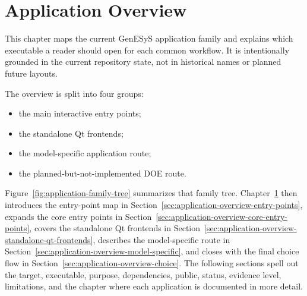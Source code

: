 \chapter{Application Overview}
\label{chap:application-overview}

This chapter maps the current GenESyS application family and explains which
executable a reader should open for each common workflow. It is intentionally
grounded in the current repository state, not in historical names or planned
future layouts.

The overview is split into four groups:
\begin{itemize}
\item the main interactive entry points;
\item the standalone Qt frontends;
\item the model-specific application route;
\item the planned-but-not-implemented DOE route.
\end{itemize}

Figure~\ref{fig:application-family-tree} summarizes that family tree. Chapter~\ref{chap:application-overview} then introduces the entry-point map in
Section~\ref{sec:application-overview-entry-points}, expands the core entry
points in Section~\ref{sec:application-overview-core-entry-points}, covers the
standalone Qt frontends in Section~\ref{sec:application-overview-standalone-qt-frontends},
describes the model-specific route in Section~\ref{sec:application-overview-model-specific},
and closes with the final choice flow in Section~\ref{sec:application-overview-choice}.
The following sections spell out the target, executable, purpose,
dependencies, public, status, evidence level, limitations, and the chapter
where each application is documented in more detail.

